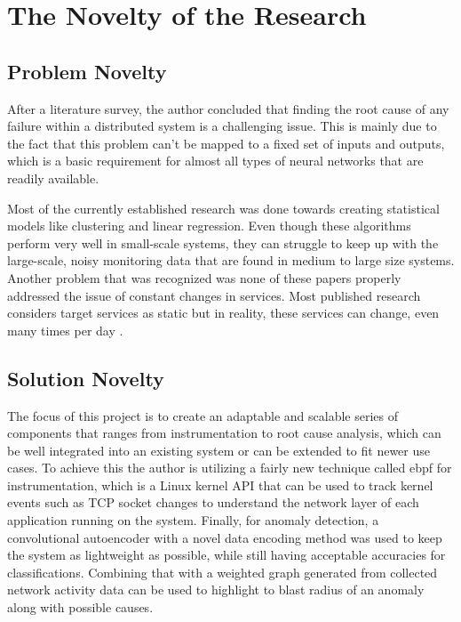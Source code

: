 \section{The Novelty of the Research}

\subsection{Problem Novelty}

After a literature survey, the author concluded that finding the root cause of any failure within a distributed system is a challenging issue. This is mainly due to the fact that this problem can't be mapped to a fixed set of inputs and outputs, which is a basic requirement for almost all types of neural networks that are readily available. 


Most of the currently established research was done towards creating statistical models like clustering and linear regression. Even though these algorithms perform very well in small-scale systems, they can struggle to keep up with the large-scale, noisy monitoring data that are found in medium to large size systems. Another problem that was recognized was none of these papers properly addressed the issue of constant changes in services. Most published research considers target services as static but in reality, these services can change, even many times per day \citep{GoingtoM51:online}.

\subsection{Solution Novelty}


The focus of this project is to create an adaptable and scalable series of components that ranges from instrumentation to root cause analysis, which can be well integrated into an existing system or can be extended to fit newer use cases. To achieve this the author is utilizing a fairly new technique called \ac{ebpf} for instrumentation, which is a Linux kernel API that can be used to track kernel events such as TCP socket changes to understand the network layer of each application running on the system. Finally, for anomaly detection, a convolutional autoencoder with a novel data encoding method was used to keep the system as lightweight as possible, while still having acceptable accuracies for classifications. Combining that with a weighted graph generated from collected network activity data can be used to highlight to blast radius of an anomaly along with possible causes.